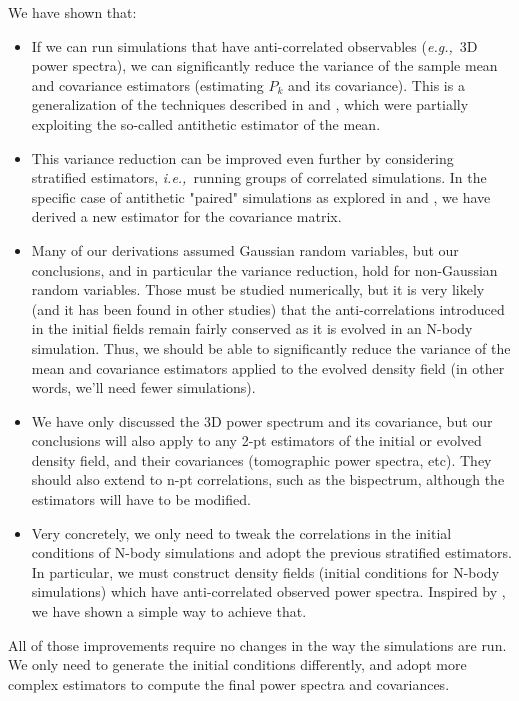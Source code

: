 \documentclass{aastex6}
\newcommand{\ie}{{\textit{i.e.,}~}}
\newcommand{\eg}{{\textit{e.g.,}~}}
\begin{document}
We have shown that:
\begin{itemize}
	\item If we can run simulations that have anti-correlated observables (\eg 3D power spectra), we can significantly reduce the variance of the sample mean and covariance estimators (estimating $P_k$ and its covariance). This is a generalization of the techniques described in \cite{PontzenEtAl2016} and \cite{AnguloPontzen2016}, which were partially exploiting the so-called antithetic estimator of the mean.
	\item This variance reduction can be improved even further by considering stratified estimators, \ie running groups of correlated simulations. In the specific case of antithetic "paired" simulations as explored in \cite{PontzenEtAl2016} and \cite{AnguloPontzen2016}, we have derived a new estimator for the covariance matrix.
	\item Many of our derivations assumed Gaussian random variables, but our conclusions, and in particular the variance reduction, hold for non-Gaussian random variables. Those must be studied numerically, but it is very likely (and it has been found in other studies) that the anti-correlations introduced in the initial fields remain fairly conserved as it is evolved in an N-body simulation.
	Thus, we should be able to significantly reduce the variance of the mean and covariance estimators applied to the evolved density field (in other words, we'll need fewer simulations).
	\item We have only discussed the 3D power spectrum and its covariance, but our conclusions will also apply to any 2-pt estimators of the initial or evolved density field, and their covariances (tomographic power spectra, etc). They should also extend to n-pt correlations, such as the bispectrum, although the estimators will have to be modified.
	\item Very concretely, we only need to tweak the correlations in the initial conditions of N-body simulations and adopt the previous stratified estimators. In particular, we must construct density fields (initial conditions for N-body simulations) which have anti-correlated observed power spectra. Inspired by \cite{AnguloPontzen2016}, we have shown a simple way to achieve that. 
\end{itemize}

All of those improvements require no changes in the way the simulations are run. We only need to generate the initial conditions differently, and adopt more complex estimators to compute the final power spectra and covariances.
\end{document}
